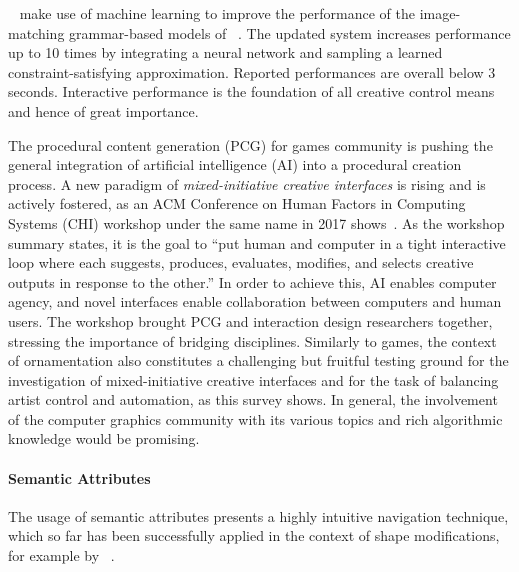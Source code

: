 \citeauthor*{ritchie_2016_ngp}~\cite{ritchie_2016_ngp} make use of machine learning to improve the performance of the image-matching grammar-based models of \citeauthor*{ritchie_2015_cpm}~\cite{ritchie_2015_cpm}. The updated system increases performance up to 10 times by integrating a neural network and sampling a learned constraint-satisfying approximation. Reported performances are overall below 3 seconds. Interactive performance is the foundation of all creative control means and hence of great importance.

The procedural content generation (PCG) for games community is pushing the general integration of artificial intelligence (AI) into a procedural creation process. A new paradigm of \textit{mixed-initiative creative interfaces} is rising and is actively fostered, as an ACM Conference on Human Factors in Computing Systems (CHI) workshop under the same name in 2017 shows~\cite{deterding_2017_mci}. As the workshop summary states, it is the goal to ``put human and computer in a tight interactive loop where each suggests, produces, evaluates, modifies, and selects creative outputs in response to the other.'' In order to achieve this, AI enables computer agency, and novel interfaces enable collaboration between computers and human users. The workshop brought PCG and interaction design researchers together, stressing the importance of bridging disciplines. Similarly to games, the context of ornamentation also constitutes a challenging but fruitful testing ground for the investigation of mixed-initiative creative interfaces and for the task of balancing artist control and automation, as this survey shows. In general, the involvement of the computer graphics community with its various topics and rich algorithmic knowledge would be promising.




\paragraph{Semantic Attributes}
\label{subsubsec:analysis_outlook_semantic}


The usage of semantic attributes presents a highly intuitive navigation technique, which so far has been successfully applied in the context of shape modifications, for example by \citeauthor*{yumer_2015_sse}~\cite{yumer_2015_sse}.

